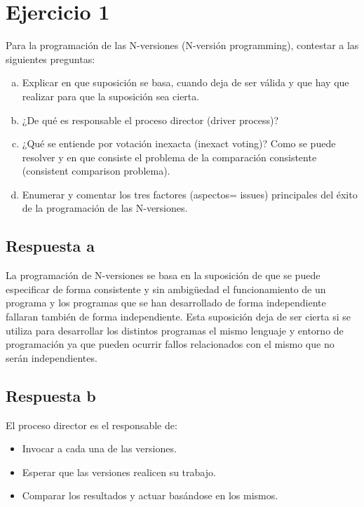 \section{Ejercicio 1}

Para la programación de las N-versiones (N-versión programming), contestar a las
siguientes preguntas:

\begin{enumerate}[a)]
	\item Explicar en que suposición se basa, cuando deja de ser válida y
		que hay que realizar para que la suposición sea cierta.
	\item ¿De qué es responsable el proceso director (driver process)?
	\item ¿Qué se entiende por votación inexacta (inexact voting)? Como se puede
	 resolver y en que consiste el problema de la comparación consistente
(consistent comparison problema).
	\item Enumerar y comentar los tres factores (aspectos= issues) principales del
éxito de la programación de las N-versiones.
\end{enumerate}

\subsection{Respuesta a}

La programación de N-versiones se basa en la suposición de que se puede
especificar de forma consistente y sin ambigüedad el funcionamiento de un
programa y los programas que se han desarrollado de forma independiente fallaran
también de forma independiente. Esta suposición deja de ser cierta si se utiliza
para desarrollar los distintos programas el mismo lenguaje y entorno de
programación ya que pueden ocurrir fallos relacionados con el mismo que no serán
independientes.

\subsection{Respuesta b}

El proceso director es el responsable de:
\begin{itemize}
	\item Invocar a cada una de las versiones.
	\item Esperar que las versiones realicen su trabajo.
	\item Comparar los resultados y actuar basándose en los mismos.
\end{itemize}

